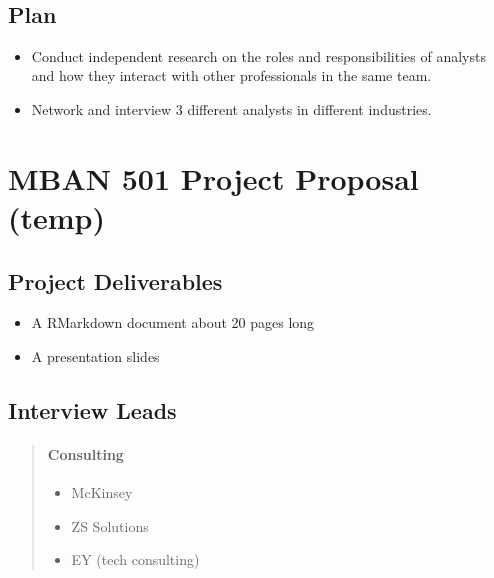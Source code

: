 \documentclass[
]{book}
\providecommand{\tightlist}{%
  \setlength{\itemsep}{0pt}\setlength{\parskip}{0pt}}
\begin{document}
~

\hypertarget{plan}{%
\section{\texorpdfstring{\textbf{Plan}}{Plan}}\label{plan}}

\begin{itemize}
\tightlist
\item
  Conduct independent research on the roles and responsibilities of analysts and how they interact with other professionals in the same team.
\item
  Network and interview 3 different analysts in different industries.
\end{itemize}

\hypertarget{mban-501-project-proposal-temp}{%
\chapter{MBAN 501 Project Proposal (temp)}\label{mban-501-project-proposal-temp}}

\hypertarget{project-deliverables}{%
\section{\texorpdfstring{\textbf{Project Deliverables}}{Project Deliverables}}\label{project-deliverables}}

\begin{itemize}
\tightlist
\item
  A RMarkdown document about 20 pages long
\item
  A presentation slides
\end{itemize}

\hypertarget{interview-leads}{%
\section{\texorpdfstring{\textbf{Interview Leads}}{Interview Leads}}\label{interview-leads}}

\begin{quote}
\hypertarget{consulting}{%
\subsubsection{\texorpdfstring{\textbf{Consulting}}{Consulting}}\label{consulting}}

\begin{itemize}
\tightlist
\item
  McKinsey
\item
  ZS Solutions
\item
  EY (tech consulting)
\end{itemize}
\end{quote}
\end{document}
